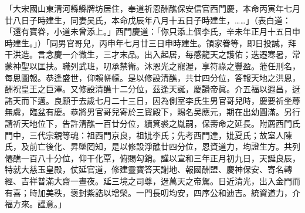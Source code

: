 \begin{myquote}[\markfont]
「大宋國山東清河縣縣牌坊居住，奉道祈恩酬醮保安信官西門慶，本命丙寅年七月廿八日子時建生，同妻吴氏，本命戊辰年八月十五日子時建生，……」{\kaishu（表白道：「還有寶眷，小道未曾添上。」西門慶道：「你只添上個李氏，辛未年正月十五日申時建生。」）}「同男官哥兒，丙申年七月廿三日申時建生。領家眷等，即日投誠，拜干洪造。言念慶一介微生，三才末品。出入起居，每感龍天之護佑；迭遷寒暑，常蒙神聖以匡扶。職列武班，叨承禁衛。沐恩光之寵渥，享符祿之豐盈。蒞任刑名，每思圖報。恭逢盛世，仰賴帡幪。是以修設清醮，共廿四分位，答報天地之洪恩，酬祝皇王之巨澤。又修設清醮十二分位，茲逢天誕，慶讚帝眞。介五福以遐昌，迓諸天而下邁。良願于去歲七月二十三日，因為側室李氏生男官哥兒時，慶要祈坐蓐無虞，臨盆有慶。恭將男官哥兒寄於三寳殿下，賜名吴應元，期在出幼圓滿。另行請祈天地位下，告許清醮一百廿分位，續箕裘之胤嗣，保壽命之延長。附薦西門氏門中，三代宗親等魂：祖西門京良，祖妣李氏；先考西門達，妣夏氏；故室人陳氏，及前亡後化、昇墜罔知，是以修設淨醮廿四分位，恩資道力，均證生方。共列僊醮一百八十分位，仰干化覃，俯賜勾銷。謹以宣和三年正月初九日，天誕良辰，特就大慈玉皇殿，仗延官道，修建靈寳答天謝地、報國酬盟、慶神保安、寄名轉經、吉祥普滿大齋一晝夜。延三境之司尊，迓萬天之帝駕。日近清光，出入金門而有喜；時加美秩，褒封紫誥以增榮。一門長叨均安，四序公和迪吉。統資道力，介福方來。謹意。」
\end{myquote}


